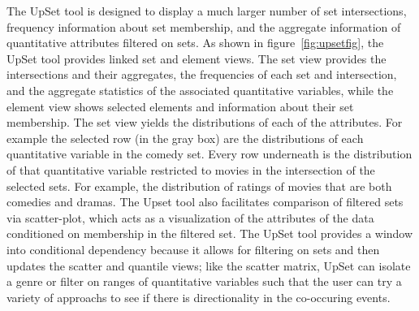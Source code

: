 \documentclass[../main.tex]{subfiles}
\begin{document}
The UpSet tool is designed to display a much larger number of set intersections, frequency information about set membership, and the aggregate information of quantitative attributes filtered on sets\cite{lex_upset_2014}. As shown in figure~\ref{fig:upsetfig}, the UpSet tool provides linked set and element views. The set view provides the intersections and their
aggregates, the frequencies of each set and intersection, and the aggregate
statistics of the associated quantitative variables, while the element view shows
selected elements and information about their set membership. The set view yields the distributions of each of the attributes. For example the selected row (in the gray box) are the distributions of each quantitative variable in the comedy set. Every row underneath is the distribution of that quantitative variable restricted to movies in the intersection of the selected sets. For example, the distribution of ratings of movies that are both comedies and dramas. The Upset tool
also facilitates comparison of filtered sets via scatter-plot, which acts as a
visualization of the attributes of the data conditioned on membership in the
filtered set.  The UpSet tool provides a window into conditional dependency because it allows for filtering on sets and then updates the scatter and quantile views; like the scatter matrix, UpSet can isolate a genre or filter on ranges of quantitative variables such that the user can try a variety of approachs to see if there is directionality in the co-occuring events. 
\end{document}
